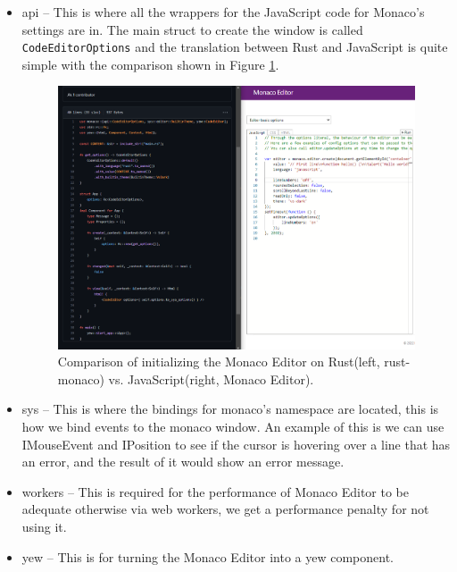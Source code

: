 \documentclass[
    paper=letter,
    parskip=half,
    fontsize=12pt,
    titlepage=firstiscover,
    toc=bibliography,
    numbers=endperiod
]{scrartcl}
\providecommand{\tightlist}{%
  \setlength{\itemsep}{0pt}\setlength{\parskip}{0pt}}
\begin{document}
\begin{itemize}
    \tightlist
    \item api -- This is where all the wrappers for the JavaScript code for
          Monaco's settings are in. The main struct to create the window is called
          \texttt{CodeEditorOptions} and the translation between Rust and
          JavaScript is quite simple with the comparison shown in Figure
          \ref{fig:monaco-initialize}.

          \begin{figure}[H]
              \includegraphics[width=\textwidth]{monaco-initialize}
              \caption{Comparison of initializing the Monaco Editor on Rust(left, rust-monaco) vs. JavaScript(right, Monaco Editor).}
              \label{fig:monaco-initialize}
          \end{figure}

    \item sys -- This is where the bindings for monaco's namespace are located,
          this is how we bind events to the monaco window. An example of this is
          we can use IMouseEvent and IPosition to see if the cursor is hovering
          over a line that has an error, and the result of it would show an error
          message.
    \item workers -- This is required for the performance of Monaco Editor to be
          adequate otherwise via web workers, we get a performance penalty for not
          using it.
    \item yew -- This is for turning the Monaco Editor into a yew component.
\end{itemize}
\end{document}
